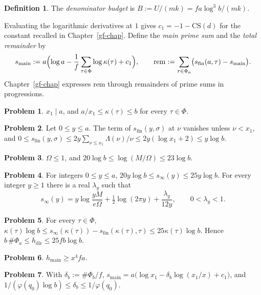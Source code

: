 \documentclass[reqno]{amsart}
\newcounter{chap}
\theoremstyle{plain}
\theoremstyle{definition}
\newtheorem{problem}{Problem}[section]
\newtheorem{definition}[theorem]{Definition}
\newcommand{\CS}{\mathrm{CS}}
\newcommand{\hdir}{h_{\mathrm{dir}}}
\newcommand{\sfin}{s_{\mathrm{fin}}}
\newcommand{\smain}{s_{\mathrm{main}}}
\newcommand{\hmain}{h_{\mathrm{main}}}
\newcommand{\rem}{\mathrm{rem}}
\begin{document}
\begin{definition}\label{def:budget}
The \emph{denominator budget} is \(B := U/(mk) = fa\log^3 b/(mk)\).
\end{definition}

Evaluating the logarithmic derivatives at \(1\) gives \(c_1 = -1 - \CS(d)\) for the constant recalled in Chapter~\ref{gf-chap}.  Define the \emph{main prime sum} and the \emph{total remainder} by
\[
  \smain := a \Bigl( \log a - \frac1f \sum_{\tau \in \Phi} \log \kappa(\tau) + c_1 \Bigr),
  \qquad
  \rem := \sum_{\tau \in \Phi_a} \bigl( \sfin(a, \tau) - \smain \bigr) .
\]
Chapter~\ref{gf-chap} expresses \(\rem\) through remainders of prime sums in progressions.

\begin{problem}\label{pr:weights}
\(x_1 \mid a\), and \(a/x_1 \le \kappa(\tau) \le b\) for every \(\tau \in \Phi\).
\end{problem}

\begin{problem}\label{pr:sfin}
Let \(0 \le y \le a\).  The term of \(\sfin(y, \sigma)\) at \(\nu\) vanishes unless \(\nu < x_1\), and \(0 \le \sfin(y, \sigma) \le 2y\sum_{\nu \le x_1} \Lambda(\nu)/\nu \le 2y(\log x_1 + 2) \le y \log b\).
\end{problem}

\begin{problem}\label{pr:omega}
\(\Omega \le 1\), and \(20 \log b \le \log(M/\Omega) \le 23 \log b\).
\end{problem}

\begin{problem}\label{pr:jet}
For integers \(0 \le y \le a\), \(20 y \log b \le s_\infty(y) \le 25 y \log b\).  For every integer \(y \ge 1\) there is a real \(\lambda_y\) such that
\[
  s_\infty(y) = y \log \frac{y M}{e\Omega} + \tfrac12 \log(2\pi y) + \frac{\lambda_y}{12 y}, \qquad 0 < \lambda_y < 1 .
\]
\end{problem}

\begin{problem}\label{pr:hdir}
For every \(\tau \in \Phi\), \(\kappa(\tau)\log b \le s_\infty(\kappa(\tau)) - \sfin(\kappa(\tau), \tau) \le 25\kappa(\tau)\log b\).  Hence \(b\, \#\Phi_a \le \hdir \le 25 f b \log b\).
\end{problem}

\begin{problem}\label{pr:main}
\(\hmain \ge x^4 f a\).
\end{problem}

\begin{problem}\label{pr:smain}
With \(\delta_b := \#\Phi_b/f\), \(\smain = a\bigl(\log x_1 - \delta_b \log(x_1/x) + c_1\bigr)\), and \(1/(\varphi(q_0)\log b) \le \delta_b \le 1/\varphi(q_0)\).
\end{problem}
\end{document}
